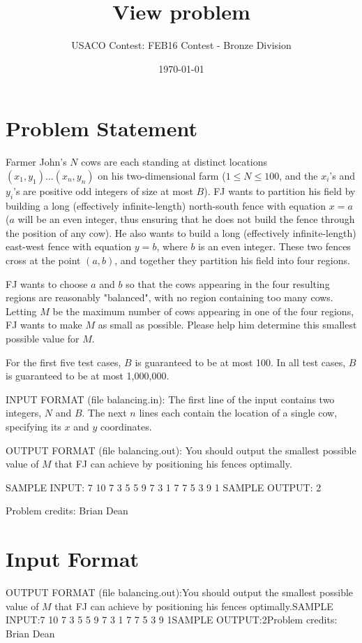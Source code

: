 \documentclass[12pt]{article}
\title{View problem}
\author{USACO Contest: FEB16 Contest - Bronze Division}
\date{\today}
\begin{document}
\maketitle

\section*{Problem Statement}

Farmer John's $N$ cows are each standing at distinct locations
$(x_1, y_1) \ldots (x_n, y_n)$ on his two-dimensional farm ($1 \leq N \leq 100$,
and the $x_i$'s and $y_i$'s are positive odd integers of size at most $B$).  FJ
wants to partition his field by building a  long (effectively infinite-length)
north-south fence with equation $x=a$ ($a$ will be an even integer, thus
ensuring that he does not build the fence through the position of any cow). He
also wants to build a long (effectively infinite-length) east-west fence with
equation $y=b$, where $b$ is an even integer.  These two fences cross at the
point $(a,b)$, and together they partition his field into four regions.  

FJ wants to choose $a$ and $b$ so that the cows appearing in the four resulting
regions are reasonably "balanced", with no region containing too many cows. 
Letting $M$ be the maximum number of cows appearing in one of the four regions,
FJ wants to make $M$ as small as possible.  Please help him determine this
smallest possible value for $M$.

For the first five test cases, $B$ is guaranteed to be at most 100.  In all test
cases, $B$ is guaranteed to be at most 1,000,000.

INPUT FORMAT (file balancing.in):
The first line of the input contains two integers, $N$ and $B$. The next $n$
lines each contain the location of a single cow, specifying its $x$ and $y$
coordinates.

OUTPUT FORMAT (file balancing.out):
You should output the smallest possible value of $M$ that FJ can achieve by
positioning his fences optimally.

SAMPLE INPUT:
7 10
7 3
5 5
9 7
3 1
7 7
5 3
9 1
SAMPLE OUTPUT: 
2

Problem credits: Brian Dean



\section*{Input Format}
OUTPUT FORMAT (file balancing.out):You should output the smallest possible value of $M$ that FJ can achieve by
positioning his fences optimally.SAMPLE INPUT:7 10
7 3
5 5
9 7
3 1
7 7
5 3
9 1SAMPLE OUTPUT:2Problem credits: Brian Dean
\end{document}
